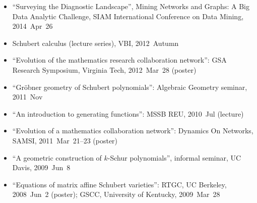 \documentclass[10pt,a4paper]{article}
\begin{document}
\begin{itemize}[label=$\circ$,nolistsep]
\item
``Surveying the Diagnostic Landscape'', Mining Networks and Graphs: A Big Data Analytic Challenge, SIAM International Conference on Data Mining, 2014~Apr~26
\item
Schubert calculus (lecture series), VBI, 2012~Autumn
\item
``Evolution of the mathematics research collaboration network'': GSA Research Symposium, Virginia Tech, 2012~Mar~28 (poster)
\item
``Gr\"obner geometry of Schubert polynomials'': Algebraic Geometry seminar, 2011~Nov
\item
``An introduction to generating functions'': MSSB REU, 2010~Jul (lecture)
\item
``Evolution of a mathematics collaboration network'': Dynamics On Networks, SAMSI, 2011~Mar~21--23 (poster)
\item
``A geometric construction of \(k\)-Schur polynomials'', informal seminar, UC Davis, 2009~Jun~8
\item
``Equations of matrix affine Schubert varieties'': RTGC, UC Berkeley, 2008~Jun~2 (poster); GSCC, University of Kentucky, 2009~Mar~28
\end{itemize}
\end{document}
